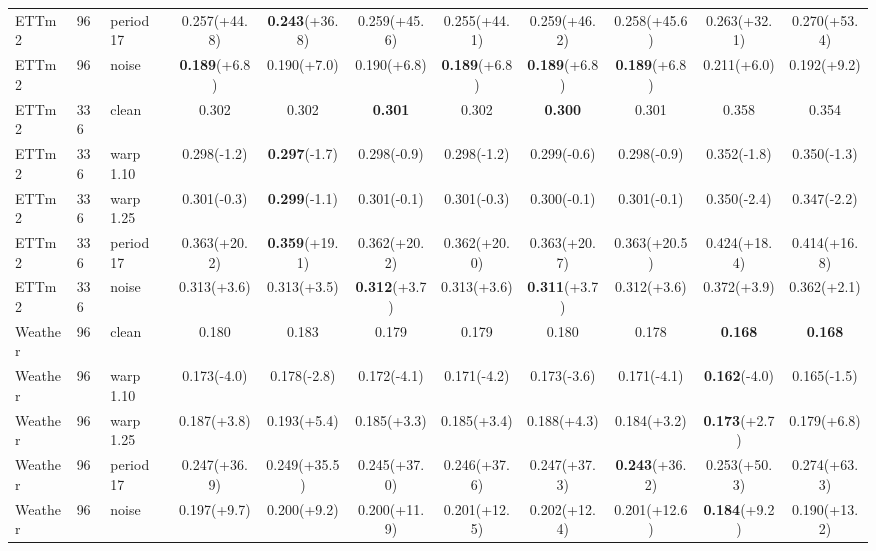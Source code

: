 \begin{tabular}{lllcccccccc}
ETTm2 & 96 & period 17 & 0.257\tiny{(+44.8)} & \textbf{0.243}\tiny{(+36.8)} & 0.259\tiny{(+45.6)} & 0.255\tiny{(+44.1)} & 0.259\tiny{(+46.2)} & 0.258\tiny{(+45.6)} & 0.263\tiny{(+32.1)} & 0.270\tiny{(+53.4)} \\
ETTm2 & 96 & noise & \textbf{0.189}\tiny{(+6.8)} & 0.190\tiny{(+7.0)} & 0.190\tiny{(+6.8)} & \textbf{0.189}\tiny{(+6.8)} & \textbf{0.189}\tiny{(+6.8)} & \textbf{0.189}\tiny{(+6.8)} & 0.211\tiny{(+6.0)} & 0.192\tiny{(+9.2)} \\
\midrule
ETTm2 & 336 & clean & 0.302 & 0.302 & \textbf{0.301} & 0.302 & \textbf{0.300} & 0.301 & 0.358 & 0.354 \\
ETTm2 & 336 & warp 1.10 & 0.298\tiny{(-1.2)} & \textbf{0.297}\tiny{(-1.7)} & 0.298\tiny{(-0.9)} & 0.298\tiny{(-1.2)} & 0.299\tiny{(-0.6)} & 0.298\tiny{(-0.9)} & 0.352\tiny{(-1.8)} & 0.350\tiny{(-1.3)} \\
ETTm2 & 336 & warp 1.25 & 0.301\tiny{(-0.3)} & \textbf{0.299}\tiny{(-1.1)} & 0.301\tiny{(-0.1)} & 0.301\tiny{(-0.3)} & 0.300\tiny{(-0.1)} & 0.301\tiny{(-0.1)} & 0.350\tiny{(-2.4)} & 0.347\tiny{(-2.2)} \\
ETTm2 & 336 & period 17 & 0.363\tiny{(+20.2)} & \textbf{0.359}\tiny{(+19.1)} & 0.362\tiny{(+20.2)} & 0.362\tiny{(+20.0)} & 0.363\tiny{(+20.7)} & 0.363\tiny{(+20.5)} & 0.424\tiny{(+18.4)} & 0.414\tiny{(+16.8)} \\
ETTm2 & 336 & noise & 0.313\tiny{(+3.6)} & 0.313\tiny{(+3.5)} & \textbf{0.312}\tiny{(+3.7)} & 0.313\tiny{(+3.6)} & \textbf{0.311}\tiny{(+3.7)} & 0.312\tiny{(+3.6)} & 0.372\tiny{(+3.9)} & 0.362\tiny{(+2.1)} \\
\midrule
Weather & 96 & clean & 0.180 & 0.183 & 0.179 & 0.179 & 0.180 & 0.178 & \textbf{0.168} & \textbf{0.168} \\
Weather & 96 & warp 1.10 & 0.173\tiny{(-4.0)} & 0.178\tiny{(-2.8)} & 0.172\tiny{(-4.1)} & 0.171\tiny{(-4.2)} & 0.173\tiny{(-3.6)} & 0.171\tiny{(-4.1)} & \textbf{0.162}\tiny{(-4.0)} & 0.165\tiny{(-1.5)} \\
Weather & 96 & warp 1.25 & 0.187\tiny{(+3.8)} & 0.193\tiny{(+5.4)} & 0.185\tiny{(+3.3)} & 0.185\tiny{(+3.4)} & 0.188\tiny{(+4.3)} & 0.184\tiny{(+3.2)} & \textbf{0.173}\tiny{(+2.7)} & 0.179\tiny{(+6.8)} \\
Weather & 96 & period 17 & 0.247\tiny{(+36.9)} & 0.249\tiny{(+35.5)} & 0.245\tiny{(+37.0)} & 0.246\tiny{(+37.6)} & 0.247\tiny{(+37.3)} & \textbf{0.243}\tiny{(+36.2)} & 0.253\tiny{(+50.3)} & 0.274\tiny{(+63.3)} \\
Weather & 96 & noise & 0.197\tiny{(+9.7)} & 0.200\tiny{(+9.2)} & 0.200\tiny{(+11.9)} & 0.201\tiny{(+12.5)} & 0.202\tiny{(+12.4)} & 0.201\tiny{(+12.6)} & \textbf{0.184}\tiny{(+9.2)} & 0.190\tiny{(+13.2)} \\

\end{tabular}
